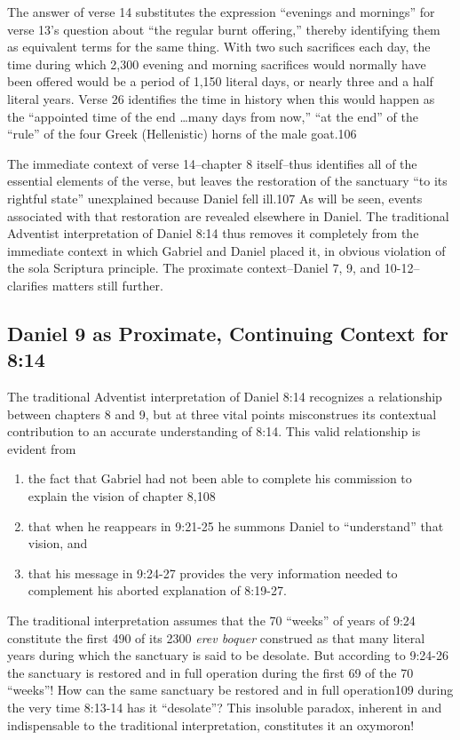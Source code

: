 The answer of verse 14 substitutes the expression ``evenings and mornings''
for verse 13's question about ``the regular burnt offering,'' thereby
identifying them as equivalent terms for the same thing. With two such
sacrifices each day, the time during which 2,300 evening and morning
sacrifices would normally have been offered would be a period of 1,150
literal days, or nearly three and a half literal years. Verse 26 identifies
the time in history when this would happen as the ``appointed time of the end
\ldots many days from now,'' ``at the end'' of the ``rule'' of the four Greek
(Hellenistic) horns of the male goat.106

The immediate context of verse 14--chapter 8 itself--thus identifies all
of the essential elements of the verse, but leaves the restoration of
the sanctuary ``to its rightful state'' unexplained because Daniel fell
ill.107 As will be seen, events associated with that restoration are
revealed elsewhere in Daniel. The traditional Adventist interpretation of
Daniel 8:14 thus removes it completely from the immediate context in which
Gabriel and Daniel placed it, in obvious violation of the sola Scriptura 
principle. The proximate context--Daniel 7, 9, and 10-12--clarifies
matters still further.

\subsection{Daniel 9 as Proximate, Continuing Context for 8:14}

The traditional Adventist interpretation of Daniel 8:14 recognizes a
relationship between chapters 8 and 9, but at three vital points
misconstrues its contextual contribution to an accurate understanding of
8:14. This valid relationship is evident from
\begin{enumerate}
	\item the fact that
Gabriel had not been able to complete his commission to explain the vision
of chapter 8,108 
	\item that when he reappears in 9:21-25 he summons Daniel to
``understand'' that vision, and 
	\item that his message in 9:24-27 provides the
very information needed to complement his aborted explanation of 8:19-27.
\end{enumerate}

The traditional interpretation assumes that the 70 ``weeks'' of years of 9:24
constitute the first 490 of its 2300 \textit{erev boquer} construed as that many
literal years during which the sanctuary is said to be desolate. But
according to 9:24-26 the sanctuary is restored and in full operation during
the first 69 of the 70 ``weeks''! How can the same sanctuary be restored and
in full operation109 during the very time 8:13-14 has it ``desolate''? This
insoluble paradox, inherent in and indispensable to the traditional
interpretation, constitutes it an oxymoron!


